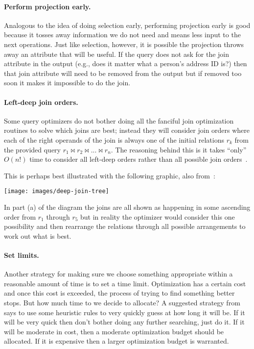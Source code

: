 \paragraph{Perform projection early.} Analogous to the idea of doing selection early, performing projection early is good because it tosses away information we do not need and means less input to the next operations. Just like selection, however, it is possible the projection throws away an attribute that will be useful. If the query does not ask for the join attribute in the output (e.g., does it matter what a person's address ID is?) then that join attribute will need to be removed from the output but if removed too soon it makes it impossible to do the join.

\paragraph{Left-deep join orders.} Some query optimizers do not bother doing all the fanciful join optimization routines to solve which joins are best; instead they will consider join orders where each of the right operands of the join is always one of the initial relations $r_{k}$ from the provided query $r_{1} \bowtie r_{2} \bowtie ... \bowtie r_{n}$. The reasoning behind this is it takes ``only'' $O(n!)$ time to consider all left-deep orders rather than all possible join orders~\cite{dsc}. 

This is perhaps best illustrated with the following graphic, also from~\cite{dsc}:

\begin{center}
	\texttt{[image: images/deep-join-tree]}
\end{center}

In part (a) of the diagram the joins are all shown as happening in some ascending order  from $r_{1}$ through $r_{5}$ but in reality the optimizer would consider this one possibility and then rearrange the relations through all possible arrangements to work out what is best.

\paragraph{Set limits.} Another strategy for making sure we choose something appropriate within a reasonable amount of time is to set a time limit. Optimization has a certain cost and once this cost is exceeded, the process of trying to find something better stops. But how much time to we decide to allocate? A suggested strategy from~\cite{dsc} says to use some heuristic rules to very quickly guess at how long it will be. If it will be very quick then don't bother doing any further searching, just do it. If it will be moderate in cost, then a moderate optimization budget should be allocated. If it is expensive then a larger optimization budget is warranted.


